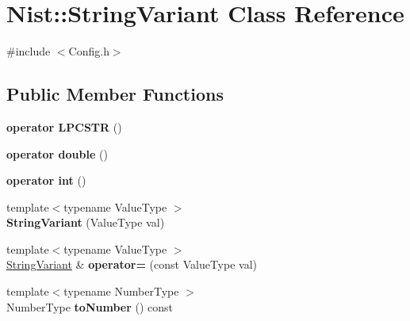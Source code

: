 \hypertarget{class_nist_1_1_string_variant}{}\section{Nist\+:\+:String\+Variant Class Reference}
\label{class_nist_1_1_string_variant}


{\ttfamily \#include $<$Config.\+h$>$}

\subsection*{Public Member Functions}
\begin{DoxyCompactItemize}
\item 
\hypertarget{class_nist_1_1_string_variant_ab2ec607fb5f377324069bc361f8279d5}{}{\bfseries operator L\+P\+C\+S\+T\+R} ()\label{class_nist_1_1_string_variant_ab2ec607fb5f377324069bc361f8279d5}

\item 
\hypertarget{class_nist_1_1_string_variant_a620b7ba95a732964365d9ec6f062863d}{}{\bfseries operator double} ()\label{class_nist_1_1_string_variant_a620b7ba95a732964365d9ec6f062863d}

\item 
\hypertarget{class_nist_1_1_string_variant_a8d7268f08deeb8d0b058e2df144dd35c}{}{\bfseries operator int} ()\label{class_nist_1_1_string_variant_a8d7268f08deeb8d0b058e2df144dd35c}

\item 
\hypertarget{class_nist_1_1_string_variant_af57e2ed9cac72e03a29f329198438fa8}{}{\footnotesize template$<$typename Value\+Type $>$ }\\{\bfseries String\+Variant} (Value\+Type val)\label{class_nist_1_1_string_variant_af57e2ed9cac72e03a29f329198438fa8}

\item 
\hypertarget{class_nist_1_1_string_variant_ab20660d0940b689d8ef761bc1695fc5f}{}{\footnotesize template$<$typename Value\+Type $>$ }\\\hyperlink{class_nist_1_1_string_variant}{String\+Variant} \& {\bfseries operator=} (const Value\+Type val)\label{class_nist_1_1_string_variant_ab20660d0940b689d8ef761bc1695fc5f}

\item 
\hypertarget{class_nist_1_1_string_variant_a7ad42b7b3775a628d5ef2c9ea9d8413a}{}{\footnotesize template$<$typename Number\+Type $>$ }\\Number\+Type {\bfseries to\+Number} () const \label{class_nist_1_1_string_variant_a7ad42b7b3775a628d5ef2c9ea9d8413a}


\end{DoxyCompactItemize}
